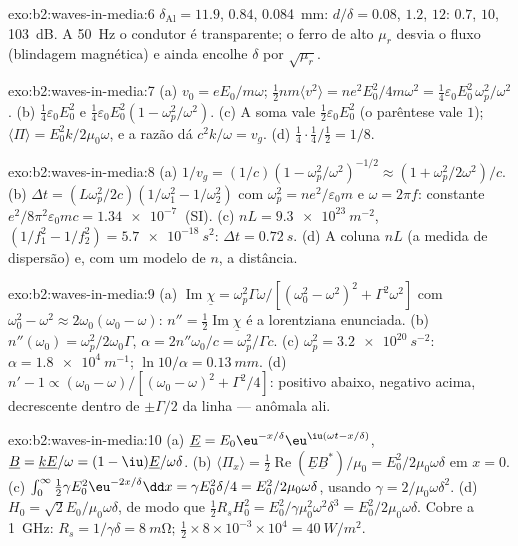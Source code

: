 \begin{solution}{exo:b2:waves-in-media:6}
$\delta_{\text{Al}} = 11.9$, $0.84$, \qty{0.084}{mm}: $d/\delta = 0.08$, $1.2$, $12$: $0.7$,
$10$, \qty{103}{dB}. A \qty{50}{Hz} o condutor é transparente; o ferro de alto
$\mu_r$ desvia o fluxo (blindagem magnética) e ainda encolhe $\delta$ por
$\sqrt{\mu_r}$.
\end{solution}

\begin{solution}{exo:b2:waves-in-media:7}
(a) $v_0 = eE_0/m\omega$; $\tfrac12nm\langle v^2\rangle = ne^2E_0^2/4m\omega^2 = \tfrac14\varepsilon_0
E_0^2\,\omega_p^2/\omega^2$. (b) $\tfrac14\varepsilon_0E_0^2$ e $\tfrac14\varepsilon_0E_0^2(1 - \omega_p^2/
\omega^2)$. (c) A soma vale $\tfrac12\varepsilon_0E_0^2$ (o parêntese vale $1$); $\langle\Pi
\rangle = E_0^2k/2\mu_0\omega$, e a razão dá $c^2k/\omega = v_g$. (d) $\tfrac14\cdot\tfrac14
/\tfrac12 = 1/8$.
\end{solution}

\begin{solution}{exo:b2:waves-in-media:8}
(a) $1/v_g = (1/c)(1 - \omega_p^2/\omega^2)^{-1/2} \approx (1 + \omega_p^2/2\omega^2)/c$. (b) $\Delta t
= (L\omega_p^2/2c)(1/\omega_1^2 - 1/\omega_2^2)$ com $\omega_p^2 = ne^2/\varepsilon_0m$ e $\omega =
2\pi f$: constante $e^2/8\pi^2\varepsilon_0mc = \qty{1.34e-7}{}$ (SI). (c) $nL = \qty{9.3e23}{m^{-2}}$,
$(1/f_1^2 - 1/f_2^2) = \qty{5.7e-18}{s^2}$: $\Delta t = \qty{0.72}{s}$. (d) A coluna $nL$
(a medida de dispersão) e, com um modelo de $n$, a distância.
\end{solution}

\begin{solution}{exo:b2:waves-in-media:9}
(a) $\operatorname{Im}\underline\chi = \omega_p^2\Gamma\omega/[(\omega_0^2 - \omega^2)^2 + \Gamma^2\omega^2]$ com
$\omega_0^2 - \omega^2 \approx 2\omega_0(\omega_0 - \omega)$: $n'' = \tfrac12\operatorname{Im}\underline\chi$ é
a lorentziana enunciada. (b) $n''(\omega_0) = \omega_p^2/2\omega_0\Gamma$, $\alpha = 2n''\omega_0/c =
\omega_p^2/\Gamma c$. (c) $\omega_p^2 = \qty{3.2e20}{s^{-2}}$: $\alpha = \qty{1.8e4}{m^{-1}}$;
$\ln10/\alpha = \qty{0.13}{mm}$. (d) $n' - 1 \propto (\omega_0 - \omega)/[(\omega_0 - \omega)^2 +
\Gamma^2/4]$: positivo abaixo, negativo acima, decrescente dentro de $\pm\Gamma/2$
da linha --- anômala ali.
\end{solution}

\begin{solution}{exo:b2:waves-in-media:10}
(a) $\underline E = E_0\eu^{-x/\delta}\eu^{\iu(\omega t - x/\delta)}$, $\underline B = \underline k\underline E/\omega
= (1 - \iu)\underline E/\omega\delta$. (b) $\langle\Pi_x\rangle = \tfrac12\operatorname{Re}(\underline E
\underline B^*)/\mu_0 = E_0^2/2\mu_0\omega\delta$ em $x = 0$. (c) $\int_0^\infty\tfrac12\gamma E_0^2
\eu^{-2x/\delta}\dd x = \gamma E_0^2\delta/4 = E_0^2/2\mu_0\omega\delta$, usando $\gamma = 2/\mu_0\omega\delta^2$.
(d) $H_0 = \sqrt2E_0/\mu_0\omega\delta$, de modo que $\tfrac12R_sH_0^2 = E_0^2/\gamma\mu_0^2\omega^2\delta^3 =
E_0^2/2\mu_0\omega\delta$. Cobre a \qty{1}{GHz}: $R_s = 1/\gamma\delta = \qty{8}{m\ohm}$;
$\tfrac12 \times 8 \times 10^{-3} \times 10^4 = \qty{40}{W/m^2}$.
\end{solution}

